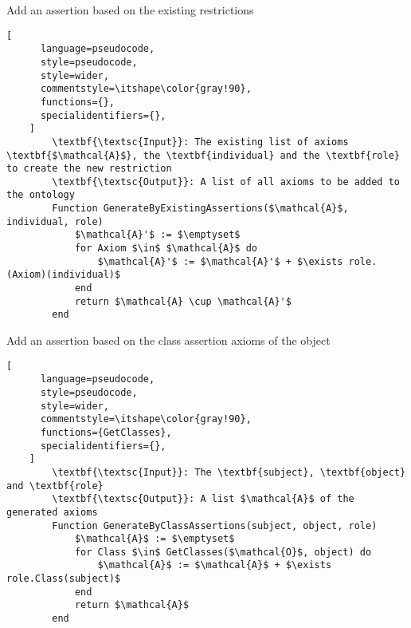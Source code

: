 \begin{programruledcaption}{Add an assertion based on the existing restrictions\label{prog:add-role-assertion-axioms}}
    \begin{lstlisting}[
      language=pseudocode,
      style=pseudocode,
      style=wider,
      commentstyle=\itshape\color{gray!90},
      functions={},
      specialidentifiers={},
    ]
        \textbf{\textsc{Input}}: The existing list of axioms \textbf{$\mathcal{A}$}, the \textbf{individual} and the \textbf{role} to create the new restriction
        \textbf{\textsc{Output}}: A list of all axioms to be added to the ontology
        Function GenerateByExistingAssertions($\mathcal{A}$, individual, role) 
            $\mathcal{A}'$ := $\emptyset$
            for Axiom $\in$ $\mathcal{A}$ do
                $\mathcal{A}'$ := $\mathcal{A}'$ + $\exists role.(Axiom)(individual)$
            end
            return $\mathcal{A} \cup \mathcal{A}'$
        end
    \end{lstlisting}
\end{programruledcaption}

\begin{programruledcaption}{Add an assertion based on the class assertion axioms of the object\label{prog:add-class-assertion-axioms}}
    \begin{lstlisting}[
      language=pseudocode,
      style=pseudocode,
      style=wider,
      commentstyle=\itshape\color{gray!90},
      functions={GetClasses},
      specialidentifiers={},
    ]
        \textbf{\textsc{Input}}: The \textbf{subject}, \textbf{object} and \textbf{role}
        \textbf{\textsc{Output}}: A list $\mathcal{A}$ of the generated axioms
        Function GenerateByClassAssertions(subject, object, role) 
            $\mathcal{A}$ := $\emptyset$
            for Class $\in$ GetClasses($\mathcal{O}$, object) do
                $\mathcal{A}$ := $\mathcal{A}$ + $\exists role.Class(subject)$
            end
            return $\mathcal{A}$
        end
    \end{lstlisting}
\end{programruledcaption}
